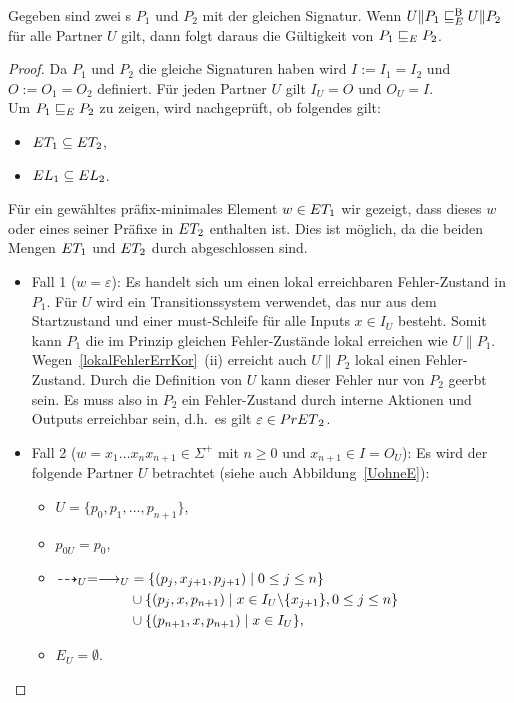 \begin{Lem}
  \label{KommVerfeinLem}
  Gegeben sind zwei \MEIO{}s $P_1$ und $P_2$ mit der gleichen Signatur. Wenn
  $U\|P_1\EBRel{} U\|P_2$ für alle Partner $U$ gilt, dann folgt daraus die
  Gültigkeit von $P_1\ERel{} P_2$.
\end{Lem}
\begin{proof}
  Da $P_1$ und $P_2$ die gleiche Signaturen haben wird $I:=I_1=I_2$ und
  $O:=O_1=O_2$ definiert. Für jeden Partner $U$ gilt $I_U=O$ und $O_U=I$.\\
  Um $P_1\ERel{}P_2$ zu zeigen, wird nachgeprüft, ob folgendes gilt:
  \begin{itemize}
    \item $\ET _1\subseteq \ET _2$,
    \item $\EL _1\subseteq \EL _2$.
  \end{itemize}
  Für ein gewähltes präfix-minimales Element $w\in\ET _1$ wir gezeigt, dass
  dieses $w$ oder eines seiner Präfixe in $\ET _2$ enthalten ist. Dies ist
  möglich, da die beiden Mengen $\ET _1$ und $\ET _2$ durch \cont{}
  abgeschlossen sind.
  \begin{itemize}
    \item Fall 1 ($w=\varepsilon$): Es handelt sich um einen lokal erreichbaren
      Fehler-Zustand in $P_1$. Für $U$ wird ein Transitionssystem verwendet,
      das nur aus dem Startzustand und einer must-Schleife für alle Inputs
      $x\in I_U$ besteht. Somit kann $P_1$ die im Prinzip gleichen
      Fehler-Zustände lokal erreichen wie $U\|P_1$.
      Wegen~\ref{lokalFehlerErrKor}~(ii) erreicht auch $U\|P_2$ lokal einen
      Fehler-Zustand. Durch die Definition von $U$ kann dieser Fehler nur von
      $P_2$ geerbt sein. Es muss also in $P_2$ ein Fehler-Zustand durch interne
      Aktionen und Outputs erreichbar sein, d.h.\ es gilt $\varepsilon\in
      \PrET{}_2$.
    \item Fall 2 ($w=x_1\dots x_n x_{n+1}\in\Sigma ^+$ mit $n\geq 0$ und
      $x_{n+1}\in I = O_U$): Es wird der folgende Partner $U$ betrachtet (siehe
      auch Abbildung~\ref{UohneE}):
      \begin{itemize}
        \item $U=\{p_0,p_1,\dots ,p_{n+1}\}$,
        \item $p_{0U}=p_0$,
        \item $\begin{aligned}[t]
            \may _U = \must _U&=\{(p_j,x_{j+1},p_{j+1})\mid  0\leq j\leq n\}\\
            &\cup\{(p_j,x,p_{n+1})\mid  x\in I_U\backslash\{x_{j+1}\}, 0\leq
            j\leq n\}\\
            &\cup\{(p_{n+1},x,p_{n+1})\mid  x\in I_U\},
        \end{aligned}$
        \item $E_U=\emptyset$.
      \end{itemize}
      \begin{figure} [h!tbp]
      \begin{center}
        \begin{tikzpicture}[auto,node distance =3cm, semithick]


\end{tikzpicture}
\end{center}
\end{figure}
\end{itemize}
\end{proof}
